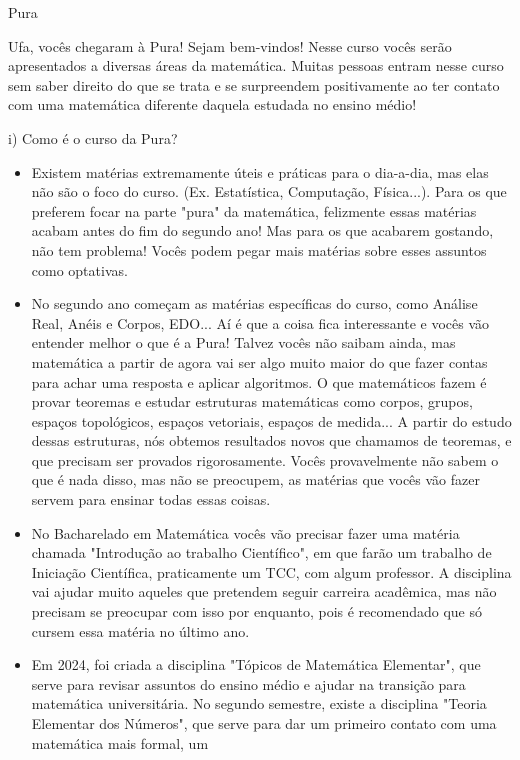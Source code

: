 \begin{subsecao}{Pura}


Ufa, vocês chegaram à Pura! Sejam bem-vindos! Nesse curso vocês serão apresentados a
diversas áreas da matemática. Muitas pessoas entram nesse curso
sem saber direito do que se trata e se surpreendem positivamente ao ter contato com uma matemática
diferente daquela estudada no ensino médio!


i) Como é o curso da Pura?
\begin{itemize}
\item  Existem matérias extremamente úteis e práticas para o dia-a-dia, mas elas
não são o foco do curso. (Ex. Estatística, Computação, Física...). Para os que 
preferem focar na parte "pura" da matemática, felizmente essas matérias acabam antes do fim do segundo ano!
Mas para os que acabarem gostando, não tem problema! Vocês podem pegar mais matérias sobre esses assuntos
como optativas.
\item No segundo ano começam as matérias específicas do curso, como Análise Real,
Anéis e Corpos, EDO... Aí é que a coisa fica interessante e vocês vão entender
melhor o que é a Pura! Talvez vocês não saibam ainda, mas matemática a partir de
agora vai ser algo muito maior do que fazer contas para achar uma resposta e aplicar
algoritmos. O que matemáticos fazem é provar teoremas e estudar estruturas matemáticas como corpos, grupos,
espaços topológicos, espaços vetoriais, espaços de medida...
A partir do estudo dessas estruturas, nós obtemos resultados novos que chamamos de teoremas, e que precisam
ser provados rigorosamente. Vocês provavelmente não sabem o que é nada disso, mas não se preocupem, 
as matérias que vocês vão fazer servem para ensinar todas essas coisas.
\item No Bacharelado em Matemática vocês vão precisar fazer uma matéria chamada "Introdução 
ao trabalho Científico", em que farão um trabalho de Iniciação Científica, praticamente um TCC, com algum 
professor. A disciplina vai ajudar muito aqueles que pretendem seguir carreira acadêmica, mas não
precisam se preocupar com isso por enquanto, pois é recomendado que só cursem essa matéria no último ano.
\item Em 2024, foi criada a disciplina "Tópicos de Matemática Elementar", que serve para revisar assuntos
do ensino médio e ajudar na transição para matemática universitária. No segundo semestre, existe a disciplina 
"Teoria Elementar dos Números", que serve para dar um primeiro contato com uma matemática mais formal, um

\end{itemize}
\end{subsecao}
